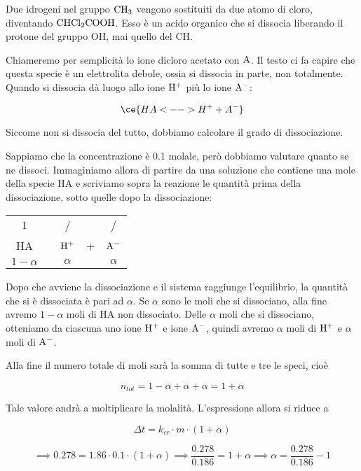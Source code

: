 \vspace{0.2cm}Due idrogeni nel gruppo $\rm CH_3$ vengono sostituiti da due atomo di cloro, diventando $\rm CHCl_2COOH$. Esso è un acido organico che si dissocia liberando il protone del gruppo OH, mai quello del CH.

\vspace{0.2cm}Chiameremo per semplicità lo ione dicloro acetato con $\rm A$. Il testo ci fa capire che questa specie è un elettrolita debole, ossia si dissocia in parte, non totalmente. Quando si dissocia dà luogo allo ione $\rm H^+$ più lo ione $\rm A^-$:

$$\ce{HA <--> H^+ + A^-}$$

Siccome non si dissocia del tutto, dobbiamo calcolare il grado di dissociazione.

Sappiamo che la concentrazione è 0.1 molale, però dobbiamo valutare quanto se ne dissoci. Immaginiamo allora di partire da una soluzione che contiene una mole della specie HA e scriviamo sopra la reazione le quantità prima della dissociazione, sotto quelle dopo la dissociazione:

\begin{center}
    \begin{tabular}{ccccc}
        $1$ & & / & & /\\
        HA & \ce{<-->} & $\rm H^+$ & + & $\rm A^-$\\
        $1 - \alpha$ &  &  $\alpha$ & & $\alpha$\\
    \end{tabular}
\end{center}

Dopo che avviene la dissociazione e il sistema raggiunge l'equilibrio, la quantità che si è dissociata è pari ad $\alpha$. Se $\alpha$ sono le moli che si dissociano, alla fine avremo $1-\alpha$ moli di HA non dissociato. Delle $\alpha$ moli che si dissociano, otteniamo da ciascuna uno ione $\rm H^+$ e ione $\rm A^-$, quindi avremo $\alpha$ moli di $\rm H^+$ e $\alpha$ moli di $\rm A^-$.

Alla fine il numero totale di moli sarà la somma di tutte e tre le speci, cioè

$$n_{tot}=1 - \alpha + \alpha + \alpha=1+\alpha$$

Tale valore andrà a moltiplicare la molalità. L'espressione allora si riduce a

$$\Delta t=k_{cr} \cdot m \cdot (1 + \alpha)$$

$$\implies
0.278 = 1.86 \cdot 0.1 \cdot (1+\alpha)
\implies
\frac{0.278}{0.186}= 1 + \alpha
\implies
\alpha=\frac{0.278}{0.186} - 1$$

